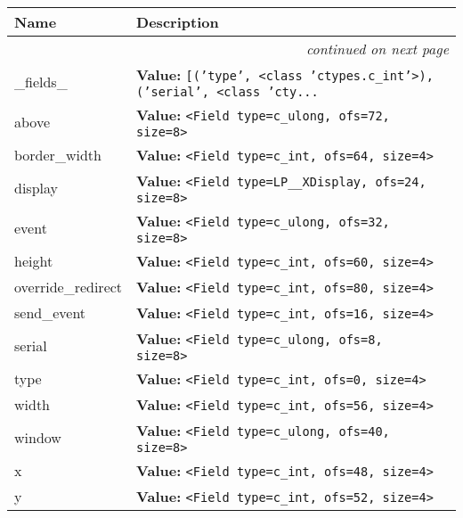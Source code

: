     \vspace{-1cm}
\hspace{\varindent}\begin{longtable}{|p{\varnamewidth}|p{\vardescrwidth}|l}
\cline{1-2}
\cline{1-2} \centering \textbf{Name} & \centering \textbf{Description}& \\
\cline{1-2}
\endhead\cline{1-2}\multicolumn{3}{r}{\small\textit{continued on next page}}\\\endfoot\cline{1-2}
\endlastfoot\raggedright \_\-f\-i\-e\-l\-d\-s\-\_\- & \raggedright \textbf{Value:} 
{\tt \texttt{[}\texttt{(}\texttt{'}\texttt{type}\texttt{'}\texttt{, }{\textless}class 'ctypes.c\_int'{\textgreater}\texttt{)}\texttt{, }\texttt{(}\texttt{'}\texttt{serial}\texttt{'}\texttt{, }{\textless}class 'cty\texttt{...}}&\\
\cline{1-2}
\raggedright a\-b\-o\-v\-e\- & \raggedright \textbf{Value:} 
{\tt {\textless}Field type=c\_ulong, ofs=72, size=8{\textgreater}}&\\
\cline{1-2}
\raggedright b\-o\-r\-d\-e\-r\-\_\-w\-i\-d\-t\-h\- & \raggedright \textbf{Value:} 
{\tt {\textless}Field type=c\_int, ofs=64, size=4{\textgreater}}&\\
\cline{1-2}
\raggedright d\-i\-s\-p\-l\-a\-y\- & \raggedright \textbf{Value:} 
{\tt {\textless}Field type=LP\_\_XDisplay, ofs=24, size=8{\textgreater}}&\\
\cline{1-2}
\raggedright e\-v\-e\-n\-t\- & \raggedright \textbf{Value:} 
{\tt {\textless}Field type=c\_ulong, ofs=32, size=8{\textgreater}}&\\
\cline{1-2}
\raggedright h\-e\-i\-g\-h\-t\- & \raggedright \textbf{Value:} 
{\tt {\textless}Field type=c\_int, ofs=60, size=4{\textgreater}}&\\
\cline{1-2}
\raggedright o\-v\-e\-r\-r\-i\-d\-e\-\_\-r\-e\-d\-i\-r\-e\-c\-t\- & \raggedright \textbf{Value:} 
{\tt {\textless}Field type=c\_int, ofs=80, size=4{\textgreater}}&\\
\cline{1-2}
\raggedright s\-e\-n\-d\-\_\-e\-v\-e\-n\-t\- & \raggedright \textbf{Value:} 
{\tt {\textless}Field type=c\_int, ofs=16, size=4{\textgreater}}&\\
\cline{1-2}
\raggedright s\-e\-r\-i\-a\-l\- & \raggedright \textbf{Value:} 
{\tt {\textless}Field type=c\_ulong, ofs=8, size=8{\textgreater}}&\\
\cline{1-2}
\raggedright t\-y\-p\-e\- & \raggedright \textbf{Value:} 
{\tt {\textless}Field type=c\_int, ofs=0, size=4{\textgreater}}&\\
\cline{1-2}
\raggedright w\-i\-d\-t\-h\- & \raggedright \textbf{Value:} 
{\tt {\textless}Field type=c\_int, ofs=56, size=4{\textgreater}}&\\
\cline{1-2}
\raggedright w\-i\-n\-d\-o\-w\- & \raggedright \textbf{Value:} 
{\tt {\textless}Field type=c\_ulong, ofs=40, size=8{\textgreater}}&\\
\cline{1-2}
\raggedright x\- & \raggedright \textbf{Value:} 
{\tt {\textless}Field type=c\_int, ofs=48, size=4{\textgreater}}&\\
\cline{1-2}
\raggedright y\- & \raggedright \textbf{Value:} 
{\tt {\textless}Field type=c\_int, ofs=52, size=4{\textgreater}}&\\
\cline{1-2}
\end{longtable}

